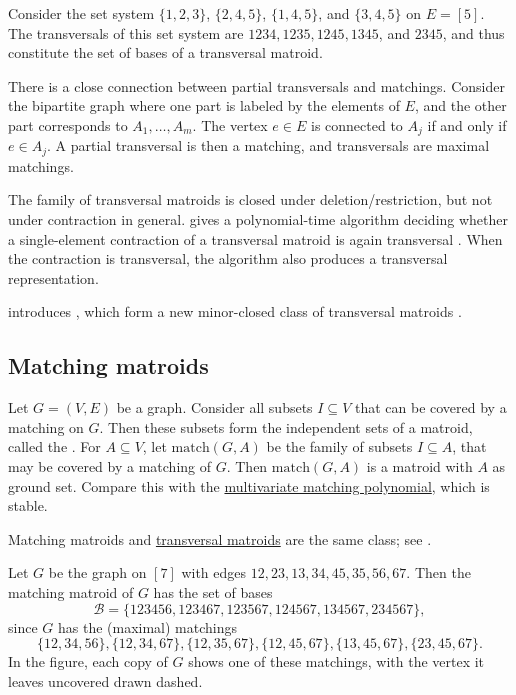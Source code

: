 \begin{example}
Consider the set system $\{1, 2, 3\}$, $\{2, 4, 5\}$, $\{1, 4, 5\}$, and $\{3, 4, 5\}$ on $E = [5]$.
The transversals of this set system are $1234,1235,1245,1345$, and $2345$,
and thus constitute the set of bases of a transversal matroid.
\end{example}

There is a close connection between partial transversals and matchings.
Consider the bipartite graph where one part is labeled by the elements of $E$,
and the other part corresponds to $A_1,\dotsc,A_m$.
The vertex $e \in E$ is connected to $A_j$ if and only if $e \in A_j$.
A partial transversal is then a matching, and transversals are maximal matchings.

The family of transversal matroids is closed under deletion/restriction, but not under contraction in general.
 gives a polynomial-time algorithm deciding whether a
single-element contraction of a transversal matroid is again transversal
\cite{Bastida2024x}.  When the contraction is transversal, the algorithm also
produces a transversal representation.

 introduces , which form a
new minor-closed class of transversal matroids \cite{Toft2025x}.


\subsection[matroidMatching]{Matching matroids}

Let $G=(V,E)$ be a graph.  Consider all subsets $I \subseteq V$ that can be covered by a matching on $G$.
Then these subsets form the independent sets of a matroid, called the
\label{matchingMatroid}.
For $A\subseteq V$, let $\mathrm{match}(G,A)$ be the family of subsets $I \subseteq A$,
that may be covered by a matching of $G$. Then $\mathrm{match}(G,A)$ is a matroid with $A$ as ground set.
Compare this with the \hyperref[stablePolynomial]{multivariate matching polynomial}, which is stable.

Matching matroids and \hyperref[transversalMatroids]{transversal matroids}
are the same class; see \cite{EdmondsFulkerson1965,Triesch1992}.

\begin{example}
Let $G$ be the graph on $[7]$ with edges $12,23,13,34,45,35,56,67$.
Then the matching matroid of $G$ has the set of bases
\[
\mathcal{B} = \{123456,123467,123567,124567,134567,234567\},
\]
since $G$ has the (maximal) matchings
\[
 \{12,34,56\}, \{12,34,67\}, \{12,35,67\}, \{12,45,67\}, \{13,45,67\}, \{23,45,67\}.
\]
In the figure, each copy of $G$ shows one of these matchings, with the
vertex it leaves uncovered drawn dashed.
\begin{figure}
\end{figure}
\end{example}




